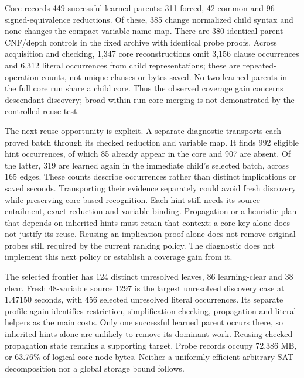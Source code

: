 \documentclass[11pt,a4paper]{article}
\numberwithin{equation}{section}
\theoremstyle{plain}
\theoremstyle{definition}
\theoremstyle{remark}
\begin{document}
Core records 449 successful learned parents: 311 forced, 42 common and 96 signed-equivalence reductions. Of these, 385 change normalized child syntax and none changes the compact variable-name map. There are 380 identical parent-CNF/depth controls in the fixed archive with identical probe proofs. Across acquisition and checking, 1,347 core reconstructions omit 3,156 clause occurrences and 6,312 literal occurrences from child representations; these are repeated-operation counts, not unique clauses or bytes saved. No two learned parents in the full core run share a child core. Thus the observed coverage gain concerns descendant discovery; broad within-run core merging is not demonstrated by the controlled reuse test.

The next reuse opportunity is explicit. A separate diagnostic transports each proved batch through its checked reduction and variable map. It finds 992 eligible hint occurrences, of which 85 already appear in the core and 907 are absent. Of the latter, 319 are learned again in the immediate child's selected batch, across 165 edges. These counts describe occurrences rather than distinct implications or saved seconds. Transporting their evidence separately could avoid fresh discovery while preserving core-based recognition. Each hint still needs its source entailment, exact reduction and variable binding. Propagation or a heuristic plan that depends on inherited hints must retain that context; a core key alone does not justify its reuse. Reusing an implication proof alone does not remove original probes still required by the current ranking policy. The diagnostic does not implement this next policy or establish a coverage gain from it.

The selected frontier has 124 distinct unresolved leaves, 86 learning-clear and 38 clear. Fresh 48-variable source 1297 is the largest unresolved discovery case at 1.47150 seconds, with 456 selected unresolved literal occurrences. Its separate profile again identifies restriction, simplification checking, propagation and literal helpers as the main costs. Only one successful learned parent occurs there, so inherited hints alone are unlikely to remove its dominant work. Reusing checked propagation state remains a supporting target. Probe records occupy 72.386 MB, or 63.76\% of logical core node bytes. Neither a uniformly efficient arbitrary-SAT decomposition nor a global storage bound follows.
\end{document}
